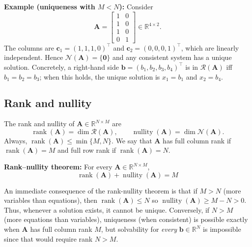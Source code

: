 \begin{exampleBox}
\textbf{Example (uniqueness with $M<N$):} Consider
\[
\mathbf{A}=\begin{bmatrix}
1&0\\ 1&0\\ 1&0\\ 0&1
\end{bmatrix}\in\mathbb{R}^{4\times 2}.
\]
The columns are $\mathbf{c}_1=(1,1,1,0)^{\top}$ and $\mathbf{c}_2=(0,0,0,1)^{\top}$, which are linearly independent. Hence $\mathcal{N}(\mathbf{A})=\{\mathbf{0}\}$ and any consistent system has a unique solution. Concretely, a right-hand side $\mathbf{b}=(b_1,b_2,b_3,b_4)^{\top}$ is in $\mathcal{R}(\mathbf{A})$ iff $b_1=b_2=b_3$; when this holds, the unique solution is $x_1=b_1$ and $x_2=b_4$.
\end{exampleBox}

\subsection{Rank and nullity} The rank and nullity of $\mathbf{A}\in\mathbb{R}^{N\times M}$ are
\[
\operatorname{rank}(\mathbf{A})=\dim\mathcal{R}(\mathbf{A}),
\qquad
\operatorname{nullity}(\mathbf{A})=\dim\mathcal{N}(\mathbf{A}).
\]
Always, $\operatorname{rank}(\mathbf{A})\le \min\{M,N\}$. We say that $\mathbf{A}$ has full column rank if $\operatorname{rank}(\mathbf{A})=M$ and full row rank if $\operatorname{rank}(\mathbf{A})=N$.

\begin{theoremBox}
\textbf{Rank--nullity theorem:}
For every $\mathbf{A}\in\mathbb{R}^{N\times M}$,
\[
\operatorname{rank}(\mathbf{A})+\operatorname{nullity}(\mathbf{A})=M
\]
\end{theoremBox}
An immediate consequence of the rank-nullity theorem is that if $M>N$ (more variables than equations), then $\operatorname{rank}(\mathbf{A})\le N$ so $\operatorname{nullity}(\mathbf{A})\ge M-N>0$. Thus, whenever a solution exists, it cannot be unique. Conversely, if $N>M$ (more equations than variables), uniqueness (when consistent) is possible exactly when $\mathbf{A}$ has full column rank $M$, but solvability for \emph{every} $\mathbf{b}\in\mathbb{R}^N$ is impossible since that would require rank $N>M$.

